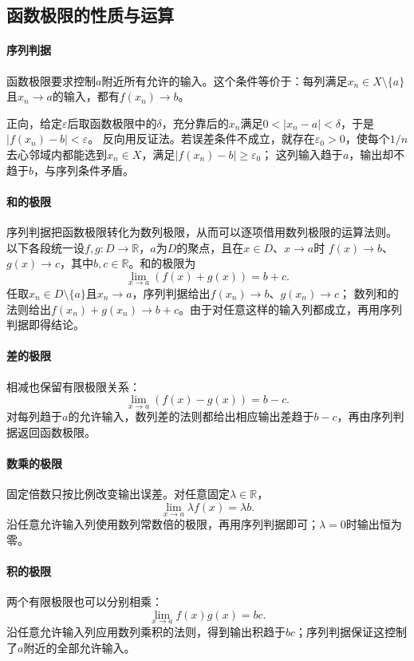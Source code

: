 \subsection{函数极限的性质与运算}
\paragraph{序列判据}

函数极限要求控制$a$附近所有允许的输入。这个条件等价于：每列满足$x_n\in X\setminus\{a\}$且$x_n\to a$的输入，都有$f(x_n)\to b$。

正向，给定$\varepsilon$后取函数极限中的$\delta$，充分靠后的$x_n$满足$0<|x_n-a|<\delta$，于是$|f(x_n)-b|<\varepsilon$。
反向用反证法。若误差条件不成立，就存在$\varepsilon_0>0$，使每个$1/n$去心邻域内都能选到$x_n\in X$，满足$|f(x_n)-b|\geq\varepsilon_0$；
这列输入趋于$a$，输出却不趋于$b$，与序列条件矛盾。

\paragraph{和的极限}
序列判据把函数极限转化为数列极限，从而可以逐项借用数列极限的运算法则。
以下各段统一设$f,g:D\to\mathbb R$，$a$为$D$的聚点，且在$x\in D$、$x\to a$时
$f(x)\to b$、$g(x)\to c$，其中$b,c\in\mathbb R$。和的极限为
\[
 \lim_{x\to a}(f(x)+g(x))=b+c.
\]
任取$x_n\in D\setminus\{a\}$且$x_n\to a$，序列判据给出$f(x_n)\to b$、$g(x_n)\to c$；
数列和的法则给出$f(x_n)+g(x_n)\to b+c$。由于对任意这样的输入列都成立，再用序列判据即得结论。

\paragraph{差的极限}
相减也保留有限极限关系：
\[
 \lim_{x\to a}(f(x)-g(x))=b-c.
\]
对每列趋于$a$的允许输入，数列差的法则都给出相应输出差趋于$b-c$，再由序列判据返回函数极限。

\paragraph{数乘的极限}
固定倍数只按比例改变输出误差。对任意固定$\lambda\in\mathbb R$，
\[
 \lim_{x\to a}\lambda f(x)=\lambda b.
\]
沿任意允许输入列使用数列常数倍的极限，再用序列判据即可；$\lambda=0$时输出恒为零。

\paragraph{积的极限}
两个有限极限也可以分别相乘：
\[
 \lim_{x\to a}f(x)g(x)=bc.
\]
沿任意允许输入列应用数列乘积的法则，得到输出积趋于$bc$；序列判据保证这控制了$a$附近的全部允许输入。

